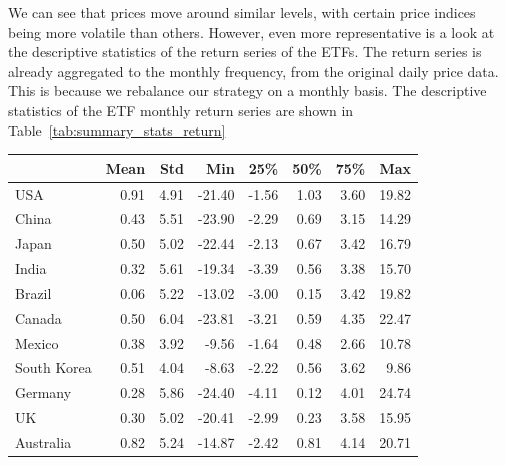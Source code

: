 \documentclass[a4paper,12pt,twoside]{article}
\begin{document}
We can see that prices move around similar levels, with certain price indices being more volatile than others. However, even more representative is a look at the descriptive statistics of the return series of the ETFs. The return series is already aggregated to the monthly frequency, from the original daily price data. This is because we rebalance our strategy on a monthly basis. The descriptive statistics of the ETF monthly return series are shown in Table~\ref{tab:summary_stats_return}

\begin{table}[ht]
\centering
\begin{tabular}{lrrrrrrr}
\toprule
             & \textbf{Mean} & \textbf{Std} & \textbf{Min} & \textbf{25\%} & \textbf{50\%} & \textbf{75\%} & \textbf{Max} \\
\midrule
USA          & 0.91          & 4.91         & -21.40       & -1.56         & 1.03          & 3.60          & 19.82       \\
China        & 0.43          & 5.51         & -23.90       & -2.29         & 0.69          & 3.15          & 14.29       \\
Japan        & 0.50          & 5.02         & -22.44       & -2.13         & 0.67          & 3.42          & 16.79       \\
India        & 0.32          & 5.61         & -19.34       & -3.39         & 0.56          & 3.38          & 15.70       \\
Brazil       & 0.06          & 5.22         & -13.02       & -3.00         & 0.15          & 3.42          & 19.82       \\
Canada       & 0.50          & 6.04         & -23.81       & -3.21         & 0.59          & 4.35          & 22.47       \\
Mexico       & 0.38          & 3.92         & -9.56        & -1.64         & 0.48          & 2.66          & 10.78       \\
South Korea  & 0.51          & 4.04         & -8.63        & -2.22         & 0.56          & 3.62          & 9.86        \\
Germany      & 0.28          & 5.86         & -24.40       & -4.11         & 0.12          & 4.01          & 24.74       \\
UK           & 0.30          & 5.02         & -20.41       & -2.99         & 0.23          & 3.58          & 15.95       \\
Australia    & 0.82          & 5.24         & -14.87       & -2.42         & 0.81          & 4.14          & 20.71       \\

\end{tabular}
\end{table}
\end{document}
